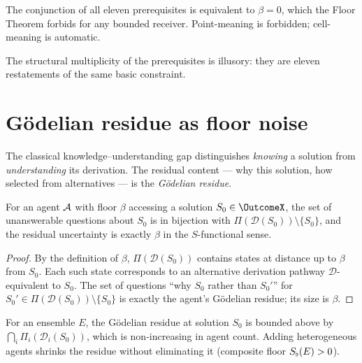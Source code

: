 \begin{corollary}\label{cor:master}
The conjunction of all eleven prerequisites is equivalent to $\beta=0$,
which the Floor Theorem forbids for any bounded receiver. Point-meaning is
forbidden; cell-meaning is automatic.
\end{corollary}

The structural multiplicity of the prerequisites is illusory: they are
eleven restatements of the same basic constraint.

\section{Gödelian residue as floor noise}
\label{sec:ch03-godel}

The classical knowledge--understanding gap \citep{godel1931,turing1936,chaitin1974}
distinguishes \emph{knowing} a solution from \emph{understanding} its
derivation. The residual content --- why this solution, how selected from
alternatives --- is the \emph{Gödelian residue}.

\begin{theorem}\label{thm:resid-floor}
For an agent $\mathcal{A}$ with floor $\beta$ accessing a solution
$S_0\in\OutcomeX$, the set of unanswerable questions about $S_0$ is in
bijection with $\Pi(\mathcal{D}(S_0))\setminus\{S_0\}$, and the residual
uncertainty is exactly $\beta$ in the $S$-functional sense.
\end{theorem}

\begin{proof}
By the definition of $\beta$, $\Pi(\mathcal{D}(S_0))$ contains states at
distance up to $\beta$ from $S_0$. Each such state corresponds to an
alternative derivation pathway $\mathcal{D}$-equivalent to $S_0$. The set
of questions ``why $S_0$ rather than $S_0'$'' for $S_0'\in\Pi(\mathcal{D}
(S_0))\setminus\{S_0\}$ is exactly the agent's Gödelian residue; its size
is $\beta$.
\end{proof}

\begin{corollary}\label{cor:resid-ens}
For an ensemble $E$, the Gödelian residue at solution $S_0$ is bounded above
by $\bigcap_i\Pi_i(\mathcal{D}_i(S_0))$, which is non-increasing in agent
count. Adding heterogeneous agents shrinks the residue without eliminating it
(composite floor $S_{\flat}(E)>0$).
\end{corollary}

